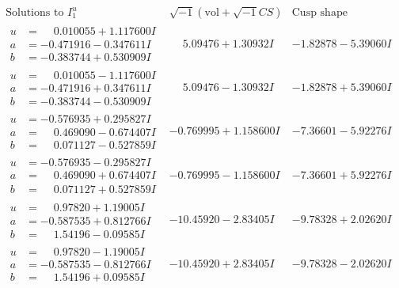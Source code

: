 \documentclass[1p]{elsarticle_modified}
\theoremstyle{definition}
\newcommand{\I}{\sqrt{-1}}
\begin{document}
$$\begin{array}{c|c|c}  
\text{Solutions to }I^u_{1}& \I (\text{vol} + \sqrt{-1}CS) & \text{Cusp shape}\\
 \hline 
\begin{aligned}
u &= \phantom{-}0.010055 + 1.117600 I \\
a &= -0.471916 - 0.347611 I \\
b &= -0.383744 + 0.530909 I\end{aligned}
 & \phantom{-}5.09476 + 1.30932 I & -1.82878 - 5.39060 I \\ \hline\begin{aligned}
u &= \phantom{-}0.010055 - 1.117600 I \\
a &= -0.471916 + 0.347611 I \\
b &= -0.383744 - 0.530909 I\end{aligned}
 & \phantom{-}5.09476 - 1.30932 I & -1.82878 + 5.39060 I \\ \hline\begin{aligned}
u &= -0.576935 + 0.295827 I \\
a &= \phantom{-}0.469090 - 0.674407 I \\
b &= \phantom{-}0.071127 - 0.527859 I\end{aligned}
 & -0.769995 + 1.158600 I & -7.36601 - 5.92276 I \\ \hline\begin{aligned}
u &= -0.576935 - 0.295827 I \\
a &= \phantom{-}0.469090 + 0.674407 I \\
b &= \phantom{-}0.071127 + 0.527859 I\end{aligned}
 & -0.769995 - 1.158600 I & -7.36601 + 5.92276 I \\ \hline\begin{aligned}
u &= \phantom{-}0.97820 + 1.19005 I \\
a &= -0.587535 + 0.812766 I \\
b &= \phantom{-}1.54196 - 0.09585 I\end{aligned}
 & -10.45920 - 2.83405 I & -9.78328 + 2.02620 I \\ \hline\begin{aligned}
u &= \phantom{-}0.97820 - 1.19005 I \\
a &= -0.587535 - 0.812766 I \\
b &= \phantom{-}1.54196 + 0.09585 I\end{aligned}
 & -10.45920 + 2.83405 I & -9.78328 - 2.02620 I \\ \hline\begin{aligned}

\end{aligned}
\end{array}$$
\end{document}
